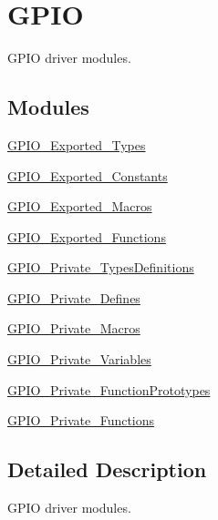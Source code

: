 \hypertarget{group___g_p_i_o}{}\section{G\+P\+IO}
\label{group___g_p_i_o}


G\+P\+IO driver modules.  


\subsection*{Modules}
\begin{DoxyCompactItemize}
\item 
\mbox{\hyperlink{group___g_p_i_o___exported___types}{G\+P\+I\+O\+\_\+\+Exported\+\_\+\+Types}}
\item 
\mbox{\hyperlink{group___g_p_i_o___exported___constants}{G\+P\+I\+O\+\_\+\+Exported\+\_\+\+Constants}}
\item 
\mbox{\hyperlink{group___g_p_i_o___exported___macros}{G\+P\+I\+O\+\_\+\+Exported\+\_\+\+Macros}}
\item 
\mbox{\hyperlink{group___g_p_i_o___exported___functions}{G\+P\+I\+O\+\_\+\+Exported\+\_\+\+Functions}}
\item 
\mbox{\hyperlink{group___g_p_i_o___private___types_definitions}{G\+P\+I\+O\+\_\+\+Private\+\_\+\+Types\+Definitions}}
\item 
\mbox{\hyperlink{group___g_p_i_o___private___defines}{G\+P\+I\+O\+\_\+\+Private\+\_\+\+Defines}}
\item 
\mbox{\hyperlink{group___g_p_i_o___private___macros}{G\+P\+I\+O\+\_\+\+Private\+\_\+\+Macros}}
\item 
\mbox{\hyperlink{group___g_p_i_o___private___variables}{G\+P\+I\+O\+\_\+\+Private\+\_\+\+Variables}}
\item 
\mbox{\hyperlink{group___g_p_i_o___private___function_prototypes}{G\+P\+I\+O\+\_\+\+Private\+\_\+\+Function\+Prototypes}}
\item 
\mbox{\hyperlink{group___g_p_i_o___private___functions}{G\+P\+I\+O\+\_\+\+Private\+\_\+\+Functions}}
\end{DoxyCompactItemize}


\subsection{Detailed Description}
G\+P\+IO driver modules. 

